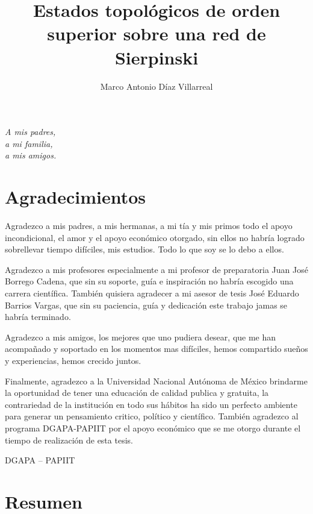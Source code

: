 \documentclass[letterpaper,12pt,oneside]{book}
\author{Marco Antonio Díaz Villarreal}
\title{Estados topológicos de orden superior sobre una red de Sierpinski}
\begin{document}
\frontmatter
\maketitle
\chapter*{}
\begin{flushright}%
  \emph{A mis padres,\\ a mi familia,\\ a mis amigos.}
  \thispagestyle{empty}
\end{flushright}

\chapter{Agradecimientos}

Agradezco a mis padres, a mis hermanas, a mi tía y mis primos todo el apoyo incondicional, el amor y el apoyo económico otorgado, sin ellos no habría logrado sobrellevar tiempo difíciles, mis estudios. Todo lo que soy se lo debo a ellos. 

Agradezco a mis profesores especialmente a mi profesor de preparatoria Juan José Borrego Cadena, que sin su soporte, guía e inspiración no habría escogido una carrera científica. También quisiera agradecer a mi asesor de tesis José Eduardo Barrios Vargas, que sin su paciencia, guía y dedicación este trabajo jamas se habría terminado.

Agradezco a mis amigos, los mejores que uno pudiera desear, que me han acompañado y soportado en los momentos mas difíciles, hemos compartido sueños y experiencias, hemos crecido juntos.

Finalmente, agradezco a la Universidad Nacional Autónoma de México brindarme la oportunidad de tener una educación de calidad publica y gratuita, la contrariedad de la institución en todo sus hábitos ha sido un perfecto ambiente para generar un pensamiento critico, político y científico. También agradezco al programa DGAPA-PAPIIT por el apoyo económico que se me otorgo durante el tiempo de realización de esta tesis.

DGAPA -- PAPIIT
\chapter{Resumen}



\tableofcontents
\end{document}
